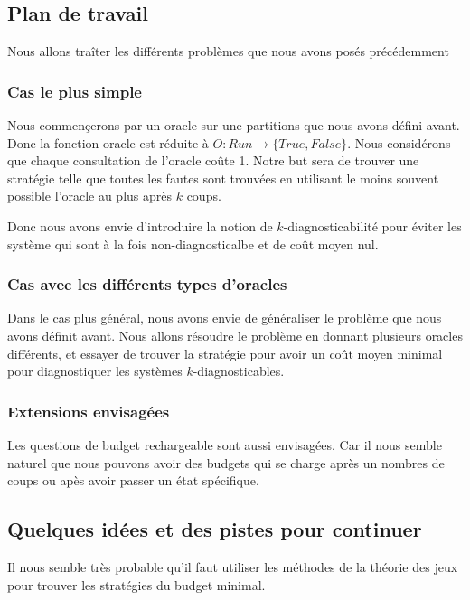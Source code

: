 \documentclass[a4paper,10pt]{article}
\begin{document}
\subsection{Plan de travail}

Nous allons tra\^iter les diff\'erents probl\`emes que nous avons pos\'es pr\'ec\'edemment

\subsubsection{Cas le plus simple}

Nous commen\c cerons par un oracle sur une partitions que nous avons d\'efini avant. Donc la fonction oracle est r\'eduite \`a $O : Run \to \{True, False\}$. Nous consid\'erons que chaque consultation de l'oracle co\^ute 1. Notre but sera de trouver une strat\'egie telle que toutes les fautes sont trouv\'ees en utilisant le moins souvent possible l'oracle au plus apr\`es $k$ coups.

Donc nous avons envie d'introduire la notion de $k$-diagnosticabilit\'e pour \'eviter les syst\`eme qui sont \`a la fois non-diagnosticalbe et de co\^ut moyen nul.

\subsubsection{Cas avec les diff\'erents types d'oracles}

Dans le cas plus g\'en\'eral, nous avons envie de g\'en\'eraliser le probl\`eme que nous avons d\'efinit avant. Nous allons r\'esoudre le probl\`eme en donnant plusieurs oracles diff\'erents, et essayer de trouver la strat\'egie pour avoir un co\^ut moyen minimal pour diagnostiquer les syst\`emes $k$-diagnosticables.

\subsubsection{Extensions envisag\'ees}
Les questions de budget rechargeable sont aussi envisag\'ees. Car il nous semble naturel que nous pouvons avoir des budgets qui se charge apr\`es un nombres de coups ou ap\`es avoir passer un \'etat sp\'ecifique.

\subsection{Quelques id\'ees et des pistes pour continuer}

Il nous semble tr\`es probable qu'il faut utiliser les m\'ethodes de la th\'eorie des jeux pour trouver les strat\'egies du budget minimal.
\end{document}
